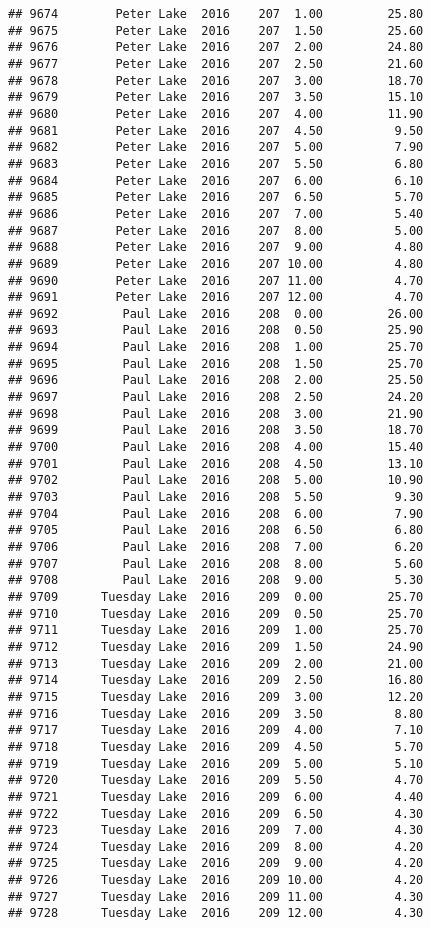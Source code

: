 \documentclass[
]{article}
\begin{document}
\begin{verbatim}
## 9674        Peter Lake  2016    207  1.00         25.80
## 9675        Peter Lake  2016    207  1.50         25.60
## 9676        Peter Lake  2016    207  2.00         24.80
## 9677        Peter Lake  2016    207  2.50         21.60
## 9678        Peter Lake  2016    207  3.00         18.70
## 9679        Peter Lake  2016    207  3.50         15.10
## 9680        Peter Lake  2016    207  4.00         11.90
## 9681        Peter Lake  2016    207  4.50          9.50
## 9682        Peter Lake  2016    207  5.00          7.90
## 9683        Peter Lake  2016    207  5.50          6.80
## 9684        Peter Lake  2016    207  6.00          6.10
## 9685        Peter Lake  2016    207  6.50          5.70
## 9686        Peter Lake  2016    207  7.00          5.40
## 9687        Peter Lake  2016    207  8.00          5.00
## 9688        Peter Lake  2016    207  9.00          4.80
## 9689        Peter Lake  2016    207 10.00          4.80
## 9690        Peter Lake  2016    207 11.00          4.70
## 9691        Peter Lake  2016    207 12.00          4.70
## 9692         Paul Lake  2016    208  0.00         26.00
## 9693         Paul Lake  2016    208  0.50         25.90
## 9694         Paul Lake  2016    208  1.00         25.70
## 9695         Paul Lake  2016    208  1.50         25.70
## 9696         Paul Lake  2016    208  2.00         25.50
## 9697         Paul Lake  2016    208  2.50         24.20
## 9698         Paul Lake  2016    208  3.00         21.90
## 9699         Paul Lake  2016    208  3.50         18.70
## 9700         Paul Lake  2016    208  4.00         15.40
## 9701         Paul Lake  2016    208  4.50         13.10
## 9702         Paul Lake  2016    208  5.00         10.90
## 9703         Paul Lake  2016    208  5.50          9.30
## 9704         Paul Lake  2016    208  6.00          7.90
## 9705         Paul Lake  2016    208  6.50          6.80
## 9706         Paul Lake  2016    208  7.00          6.20
## 9707         Paul Lake  2016    208  8.00          5.60
## 9708         Paul Lake  2016    208  9.00          5.30
## 9709      Tuesday Lake  2016    209  0.00         25.70
## 9710      Tuesday Lake  2016    209  0.50         25.70
## 9711      Tuesday Lake  2016    209  1.00         25.70
## 9712      Tuesday Lake  2016    209  1.50         24.90
## 9713      Tuesday Lake  2016    209  2.00         21.00
## 9714      Tuesday Lake  2016    209  2.50         16.80
## 9715      Tuesday Lake  2016    209  3.00         12.20
## 9716      Tuesday Lake  2016    209  3.50          8.80
## 9717      Tuesday Lake  2016    209  4.00          7.10
## 9718      Tuesday Lake  2016    209  4.50          5.70
## 9719      Tuesday Lake  2016    209  5.00          5.10
## 9720      Tuesday Lake  2016    209  5.50          4.70
## 9721      Tuesday Lake  2016    209  6.00          4.40
## 9722      Tuesday Lake  2016    209  6.50          4.30
## 9723      Tuesday Lake  2016    209  7.00          4.30
## 9724      Tuesday Lake  2016    209  8.00          4.20
## 9725      Tuesday Lake  2016    209  9.00          4.20
## 9726      Tuesday Lake  2016    209 10.00          4.20
## 9727      Tuesday Lake  2016    209 11.00          4.30
## 9728      Tuesday Lake  2016    209 12.00          4.30
\end{verbatim}
\end{document}

